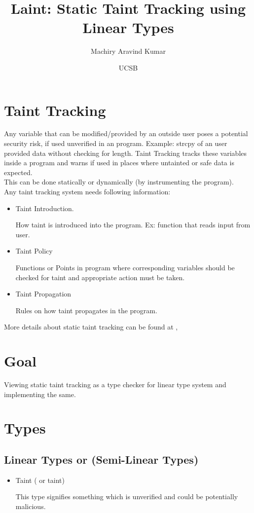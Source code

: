 \documentclass[11pt, pdftex]{article}
\title{Laint: Static Taint Tracking using Linear Types}
\author{Machiry Aravind Kumar}
\date{UCSB}
\begin{document}
\maketitle
\section{Taint Tracking}
Any variable that can be modified/provided by an outside user poses a potential security risk, if used unverified in an program. Example: strcpy of an user provided data without checking for length. Taint Tracking tracks these variables inside a program and warns if used in places where untainted or safe data is expected. \\
This can be done statically or dynamically (by instrumenting the program).\\
Any taint tracking system needs following information:
\begin{itemize}
\item Taint Introduction.
\begin{description}
How taint is introduced into the program. Ex: function that reads input from user.
\end{description}
\item Taint Policy
\begin{description}
Functions or Points in program where corresponding variables should be checked for taint and appropriate action must be taken.
\end{description}
\item {Taint Propagation}
\begin{description}
Rules on how taint propagates in the program.
\end{description}
\end{itemize}
More details about static taint tracking can be found at \cite{Wiki03}, \cite{Write04}
\section{Goal}
Viewing static taint tracking as a type checker for linear type system and implementing the same.
\section{Types}
\subsection{Linear Types or (Semi-Linear Types)}
\begin{itemize}
\item Taint ( or taint)
\begin{description}
This type signifies something which is unverified and could be potentially malicious.
\end{description}
\end{itemize}
\end{document}
